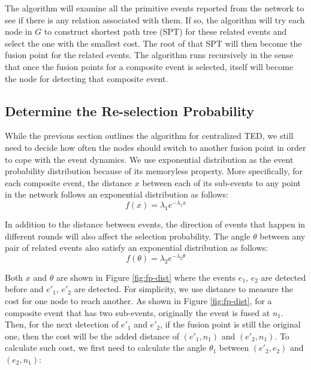 The algorithm will examine all the primitive events reported from the network to see if there is any relation associated with them. If so, the algorithm will try each node in \(G\) to construct shortest path tree (SPT) for these related events and select the one with the smallest cost. The root of that SPT will then become the fusion point for the related events. The algorithm runs recursively in the sense that once the fusion points for a composite event is selected, itself will become the node for detecting that composite event.

\subsection{Determine the Re-selection Probability}
While the previous section outlines the algorithm for centralized TED, we still need to decide how often the nodes should switch to another fusion point in order to cope with the event dynamics. We use exponential distribution as the event probability distribution because of its memoryless property. More specifically, for each composite event, the distance \(x\) between each of its sub-events to any point in the network follows an exponential distribution as follows:
\begin{displaymath}
f(x)={\lambda}_1e^{-{\lambda}_1x}
\end{displaymath}

In addition to the distance between events, the direction of events that happen in different rounds will also affect the selection probability. The angle \(\theta\) between any pair of related events also satisfy an exponential distribution as follows:
\begin{displaymath}
f(\theta)={\lambda}_2e^{-{\lambda}_2\theta}
\end{displaymath}

Both \(x\) and \(\theta\) are shown in Figure \ref{fig:fp-dist} where the events \(e_1\), \(e_2\) are detected before and \(e'_1\), \(e'_2\) are detected. For simplicity, we use distance to measure the cost for one node to reach another. As shown in Figure \ref{fig:fp-dist}, for a composite event that has two sub-events, originally the event is fused at \(n_1\). Then, for the next detection of \(e'_1\) and \(e'_2\), if the fusion point is still the original one, then the cost will be the added distance of \((e'_1, n_1)\) and \((e'_2, n_1)\). To calculate such cost, we first need to calculate the angle \({\theta}_1\) between \((e'_2, e_2)\) and \((e_2, n_1)\):

